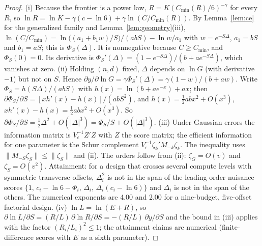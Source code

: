 \begin{proof}
(i) Because the frontier is a power law, $R=K(C_{\min}(R)/6)^{-\gamma}$ for every $R$, so
$\ln R=\ln K-\gamma(c-\ln6)+\gamma\ln(C/C_{\min}(R))$. By Lemma~\ref{lem:ce} for the generalized family and
Lemma~\ref{lem:geometry}(iii), $\ln(C/C_{\min})=\ln\big((a_1+b_1w)/S\big)/(abS)-\ln w/a_1$ with $w=e^{-S\Delta}$,
$a_1=bS$ and $b_1=aS$; this is $\Phi_S(\Delta)$. It is nonnegative because $C\ge C_{\min}$, and $\Phi_S(0)=0$. Its
derivative is $\Phi_S'(\Delta)=(1-e^{-S\Delta})/(b+ae^{-S\Delta})$, which vanishes at zero.
(ii) Holding $(n,d)$ fixed, $\Delta$ depends on $\ln G$ (with derivative $-1$) but not on $S$. Hence
$\partial y/\partial\ln G=\gamma\Phi_S'(\Delta)=\gamma(1-w)/(b+aw)$. Write $\Phi_S=h(S\Delta)/(abS)$ with
$h(x)=\ln(b+ae^{-x})+ax$; then $\partial\Phi_S/\partial S=[xh'(x)-h(x)]/(abS^2)$, and
$h(x)=\tfrac12abx^2+O(x^3)$, $xh'(x)-h(x)=\tfrac12abx^2+O(x^3)$. So
$\partial\Phi_S/\partial S=\tfrac12\Delta^2+O(|\Delta|^3)=\Phi_S/S+O(|\Delta|^3)$.
(iii) Under Gaussian errors the information matrix is $V_\epsilon^{-1}Z'Z$ with $Z$ the score matrix; the efficient
information for one parameter is the Schur complement $V_\epsilon^{-1}\zeta_k'M_{-k}\zeta_k$. The inequality uses
$\|M_{-S}\zeta_S\|\le\|\zeta_S\|$ and (ii). The orders follow from (ii): $\zeta_G=O(v)$ and $\zeta_S=O(v^2)$.
Attainment: for a design that crosses several compute levels with symmetric transverse offsets, $\Delta_i^2$ is not in
the span of the leading-order nuisance scores $\{1,\,c_i-\ln6-\Phi_i,\,\Delta_i,\,\Delta_i(c_i-\ln6)\}$ and $\Delta_i$ is not in
the span of the others. The numerical exponents are 4.00 and 2.00 for a nine-budget, five-offset factorial design.
(iv) $\ln L=\ln(E+R)$, so $\partial\ln L/\partial S=(R/L)\,\partial\ln R/\partial S=-(R/L)\,\partial y/\partial S$ and the bound
in (iii) applies with the factor $(R_i/L_i)^2\le1$; the attainment claims are numerical (finite-difference scores with $E$
as a sixth parameter).
\end{proof}

